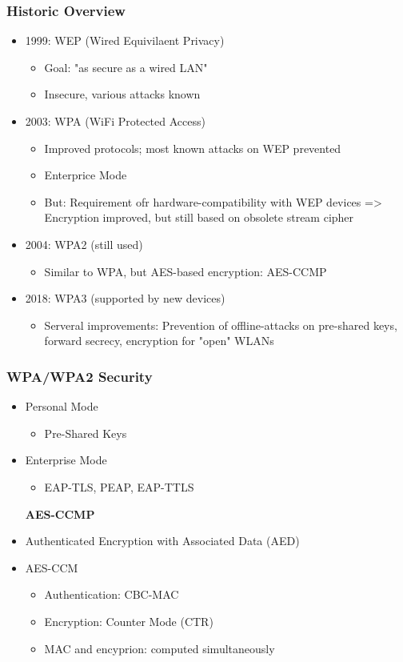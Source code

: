\subsubsection{Historic Overview}
\begin{itemize}
  \item 1999: WEP (Wired Equivilaent Privacy)
    \begin{itemize}
      \item Goal: "as secure as a wired LAN"
      \item Insecure, various attacks known
    \end{itemize}
  \item 2003: WPA (WiFi Protected Access)
    \begin{itemize}
      \item Improved protocols; most known attacks on WEP prevented
      \item Enterprice Mode
      \item But: Requirement ofr hardware-compatibility with WEP devices => Encryption improved, but still based on obsolete stream cipher
    \end{itemize}
  \item 2004: WPA2 (still used) 
    \begin{itemize}
      \item Similar to WPA, but AES-based encryption: AES-CCMP
    \end{itemize}
  \item 2018: WPA3 (supported by new devices) 
    \begin{itemize}
      \item Serveral improvements: 
        Prevention of offline-attacks on pre-shared keys, forward secrecy, encryption for "open" WLANs
    \end{itemize}
\end{itemize}
\subsubsection{WPA/WPA2 Security}
\begin{itemize}
  \item Personal Mode
    \begin{itemize}
      \item Pre-Shared Keys
    \end{itemize}
  \item Enterprise Mode 
    \begin{itemize}
      \item EAP-TLS, PEAP, EAP-TTLS
    \end{itemize}

\textbf{AES-CCMP}\\
  \item Authenticated Encryption with Associated Data (AED)
  \item AES-CCM
    \begin{itemize}
      \item Authentication: CBC-MAC
      \item Encryption: Counter Mode (CTR)
      \item MAC and encyprion: computed simultaneously
    \end{itemize}
\end{itemize}

